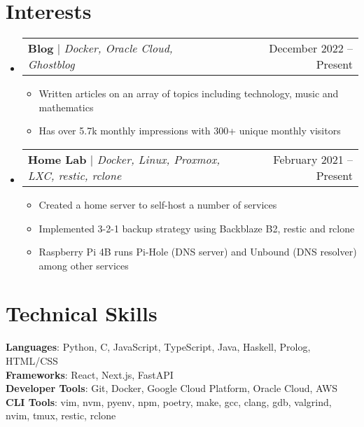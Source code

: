 \documentclass[letterpaper,11pt]{article}
\makeatletter
\newcommand{\resumeItem}[1]{
  \item\small{
    {#1 \vspace{-2pt}}
  }
}
\newcommand{\resumeProjectHeading}[2]{
    \item
    \begin{tabular*}{0.97\textwidth}{l@{\extracolsep{\fill}}r}
      \small#1 & #2 \\
    \end{tabular*}\vspace{-7pt}
}
\newcommand{\resumeSubHeadingListStart}{\begin{itemize}[leftmargin=0.15in, label={}]}
\newcommand{\resumeSubHeadingListEnd}{\end{itemize}}
\newcommand{\resumeItemListStart}{\begin{itemize}}
\newcommand{\resumeItemListEnd}{\end{itemize}\vspace{-5pt}}
\makeatother
\begin{document}
\section{Interests}
\resumeSubHeadingListStart
  \resumeProjectHeading
    {\textbf{Blog} $|$ \emph{Docker, Oracle Cloud, Ghostblog}}{December 2022 -- Present}
    \resumeItemListStart
      \resumeItem{Written articles on an array of topics including technology, music and mathematics}
      \resumeItem{Has over 5.7k monthly impressions with 300+ unique monthly visitors}
  \resumeItemListEnd
  \resumeProjectHeading
  {\textbf{Home Lab} $|$ \emph{Docker, Linux, Proxmox, LXC, restic, rclone}}{February 2021 -- Present}
  \resumeItemListStart
    \resumeItem{Created a home server to self-host a number of services}
    \resumeItem{Implemented 3-2-1 backup strategy using Backblaze B2, restic and rclone}
    \resumeItem{Raspberry Pi 4B runs Pi-Hole (DNS server) and Unbound (DNS resolver) among other services}
  \resumeItemListEnd
\resumeSubHeadingListEnd

%
\section{Technical Skills}
 \begin{itemize}[leftmargin=0.15in, label={}]
    \small{\item{
     \textbf{Languages}{: Python, C, JavaScript, TypeScript, Java, Haskell, Prolog, HTML/CSS} \\
     \textbf{Frameworks}{: React, Next.js, FastAPI} \\
     \textbf{Developer Tools}{: Git, Docker, Google Cloud Platform, Oracle Cloud, AWS} \\
     \textbf{CLI Tools}{: vim, nvm, pyenv, npm, poetry, make, gcc, clang, gdb, valgrind, nvim, tmux, restic, rclone}
    }}
 \end{itemize}


\end{document}
